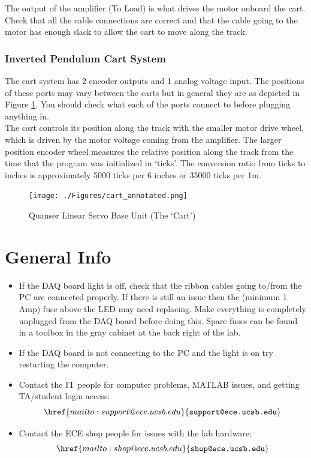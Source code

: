 \documentclass[11pt,letterpaper]{article}
\begin{document}
The output of the amplifier (To Load) is what drives the motor onboard the cart. Check that all the cable connections are correct and that the cable going to the motor has enough slack to allow the cart to move along the track. 

\subsubsection{Inverted Pendulum Cart System}
The cart system has 2 encoder outputs and 1 analog voltage input. The positions of these ports may vary between the carts but in general they are as depicted in Figure \ref{fig:cart}. You should check what each of the ports connect to before plugging anything in. \\

The cart controls its position along the track with the smaller motor drive wheel, which is driven by the motor voltage coming from the amplifier. The larger position encoder wheel measures the relative position along the track from the time that the program was initialized in `ticks'. The conversion ratio from ticks to inches is approximately 5000 ticks per 6 inches or 35000 ticks per 1m.
\begin{figure}[H]
  \centering
  \texttt{[image: ./Figures/cart\_annotated.png]}
  \caption{Quanser Linear Servo Base Unit (The `Cart')}
  \label{fig:cart}
\end{figure}






\section{General Info}
\begin{itemize}
  \item If the DAQ board light is off, check that the ribbon cables going to/from the PC are connected properly. If there is still an issue then the (minimum 1 Amp) fuse above the LED may need replacing. Make everything is completely unplugged from the DAQ board before doing this. Spare fuses can be found in a toolbox in the gray cabinet at the back right of the lab.
  \item If the DAQ board is not connecting to the PC and the light is on try restarting the computer.
  \item Contact the IT people for computer problems, MATLAB issues, and getting TA/student login access:
  \[\href{mailto:support@ece.ucsb.edu}{\texttt{support@ece.ucsb.edu}}\]
  \item Contact the ECE shop people for issues with the lab hardware:
  \[\href{mailto:shop@ece.ucsb.edu}{\texttt{shop@ece.ucsb.edu}}\]
\end{itemize}
\end{document}
